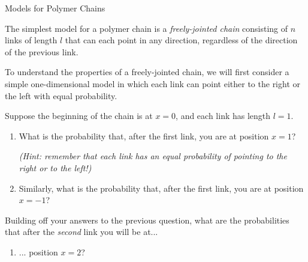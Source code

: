 \begin{activity}{Models for Polymer Chains}
\begin{instructornotes}
\end{instructornotes}


\begin{model}
\label{\labelbase:mdl:randomwalks}

	The simplest model for a polymer chain is a \emph{freely-jointed chain} consisting of $n$ links of length $l$ that can each point in any direction, regardless of the direction of the previous link.
	
	To understand the properties of a freely-jointed chain, we will first consider a simple one-dimensional model in which each link can point either to the right or the left with equal probability.

\end{model}


\begin{ctqs}

	\question Suppose the beginning of the chain is at $x=0$, and each link has length $l=1$.
	
		\begin{enumerate}
			\item What is the probability that, after the first link, you are at position $x=1$?
			
				\emph{(Hint: remember that each link has an equal probability of pointing to the right or to the left!)}
				
				\begin{solution}[0.5in]
				\end{solution}
				
			\item Similarly, what is the probability that, after the first link, you are at position $x=-1$?
				
				\begin{solution}[0.5in]
				\end{solution}
			
		\end{enumerate}
		
	\question Building off your answers to the previous question, what are the probabilities that after the \emph{second} link you will be at...
	
		\begin{enumerate}
			
			\item ... position $x=2$?
			

\end{enumerate}
\end{ctqs}
\end{activity}

